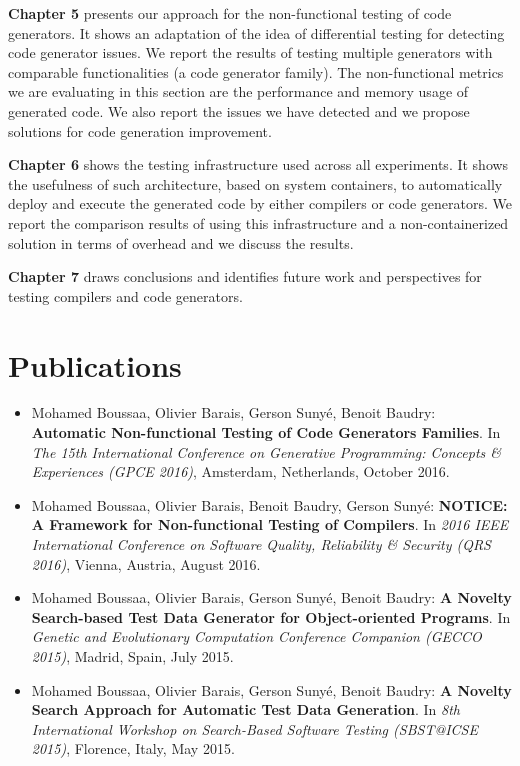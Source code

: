 \textbf{Chapter 5} presents our approach for the non-functional testing of code generators. It shows an adaptation of the idea of differential testing for detecting code generator issues. We report the results of testing multiple generators with comparable functionalities (a code generator family). The non-functional metrics we are evaluating in this section are the performance and memory usage of generated code. We also report the issues we have detected and we propose solutions for code generation improvement.

\textbf{Chapter 6} shows the testing infrastructure used across all experiments. It shows the usefulness of such architecture, based on system containers, to automatically deploy and execute the generated code by either compilers or code generators. We report the comparison results of using this infrastructure and a non-containerized solution in terms of overhead and we discuss the results. 

\textbf{Chapter 7} draws conclusions and identifies future work and perspectives for testing compilers and code generators.

\section{Publications}

\begin{itemize}
	
	\item Mohamed Boussaa, Olivier Barais, Gerson Sunyé, Benoit Baudry:
	\textbf{Automatic Non-functional Testing of Code Generators Families}. In
	\textit{The 15th International Conference on Generative Programming: Concepts \& Experiences (GPCE 2016)},
	Amsterdam, Netherlands, October 2016.

	\item Mohamed Boussaa, Olivier Barais, Benoit Baudry, Gerson Sunyé:
	\textbf{NOTICE: A Framework for Non-functional Testing of Compilers}. In 
	\textit{2016 IEEE International Conference on Software Quality, Reliability \& Security (QRS 2016)}, Vienna, Austria, August 2016.
	
	\item Mohamed Boussaa, Olivier Barais, Gerson Sunyé, Benoit Baudry:
	\textbf{A Novelty Search-based Test Data Generator for Object-oriented Programs}. In 
	\textit{Genetic and Evolutionary Computation Conference Companion (GECCO 2015)}, 
	Madrid, Spain, July 2015.
	
	\item Mohamed Boussaa, Olivier Barais, Gerson Sunyé, Benoit Baudry:
	\textbf{A Novelty Search Approach for Automatic Test Data Generation}. In
	\textit{8th International Workshop on Search-Based Software Testing (SBST@ICSE 2015)}, 
	Florence, Italy, May 2015.

	
	
\end{itemize}


